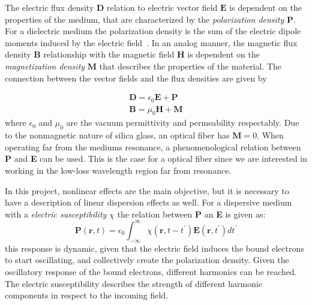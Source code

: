 The electric flux density $\textbf{D}$ relation to electric vector field $\textbf{E}$ is dependent on the properties of the medium, that are characterized by the \emph{polarization density} $\textbf{P}$. For a dielectric medium the polarization density is the sum of the electric dipole moments induced by the electric field~\cite{FundPhoto}. In an analog manner, the magnetic flux density $\textbf{B}$ relationship with the magnetic field $\textbf{H}$ is dependent on  the \emph{magnetization density} $\textbf{M}$ that describes the properties of the material. The connection between the vector fields and the flux densities  are given by

\begin{subequations}
\begin{gather}
\textbf{D}=\epsilon_0 \textbf{E}+\textbf{P}\\
\textbf{B}=\mu_0\textbf{H}+\textbf{M}%
\end{gather}
\end{subequations}
where $\epsilon_0$ and $\mu_0$ are the vacuum permittivity and permeability respectably. Due to the nonmagnetic nature of silica glass, an optical fiber has $\textbf{M}=0$. When operating far from the mediums resonance, a phenomenological relation between  \textbf{P} and \textbf{E} can be used. This is the case for a optical fiber since we are interested in working in the low-loss wavelength region far from resonance.

In this project, nonlinear effects are the main objective, but it is necessary to have a description of linear dispersion effects as well. For a dispersive medium with a \emph{electric susceptibility }$\chi$  the relation between \textbf{P} an \textbf{E} is given as\cite{FiberAgrawal}:
\begin{equation}
\textbf{P}(\textbf{r},t)=\epsilon_0 \int^{\infty}_{-\infty} \chi(\textbf{r},t-t^\prime)\textbf{E}(\textbf{r},t^\prime)dt^\prime
\end{equation}
this response is dynamic, given that the electric field induces the bound electrons to start oscillating, and collectively create the polarization density. Given the oscillatory  response of the bound electrons, different harmonics can be reached. The electric susceptibility describes the strength of different harmonic components in respect to the incoming field.


